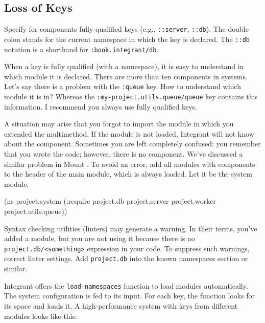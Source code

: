 \fi

\subsection{Loss of Keys}


Specify for components fully qualified keys (e.g., \verb|::server|, \verb|::db|). The double colon stands for the current namespace in which the key is declared. The \verb|::db| notation is a shorthand for \verb|:book.integrant/db|.

When a key is fully qualified (with a namespace), it is easy to understand in which module it is declared. There are more than ten components in systems. Let's say there is a problem with the \verb|:queue| key. How to understand which module it is in? Whereas the \texttt{:my-project.utils.queue\-/queue} key contains this information. I recommend you always use fully qualified keys.

A situation may arise that you forgot to import the module in which you extended the multimethod. If the module is not loaded, Integrant will not know about the component. Sometimes you are left completely confused: you remember that you wrote the code; however, there is no component. We've discussed a similar problem in Mount . To avoid an error, add all modules with components to the header of the main module, which is always loaded. Let it be the system module.

\begin{english}
  \begin{clojure}
(ns project.system
  (:require project.db
            project.server
            project.worker
            project.utils.queue))
  \end{clojure}
\end{english}

Syntax checking utilities (linters) may generate a warning. In their terms, you've added a module, but you are not using it because there is no \verb|project.db/<something>| expression in your code. To suppress such warnings, correct linter settings. Add \verb|project.db| into the known namespaces section or similar.



Integrant offers the \verb|load-namespaces| function to load modules automatically. The system configuration is fed to its input. For each key, the function looks for its space and loads it. A high-performance system with keys from different modules looks like this:

